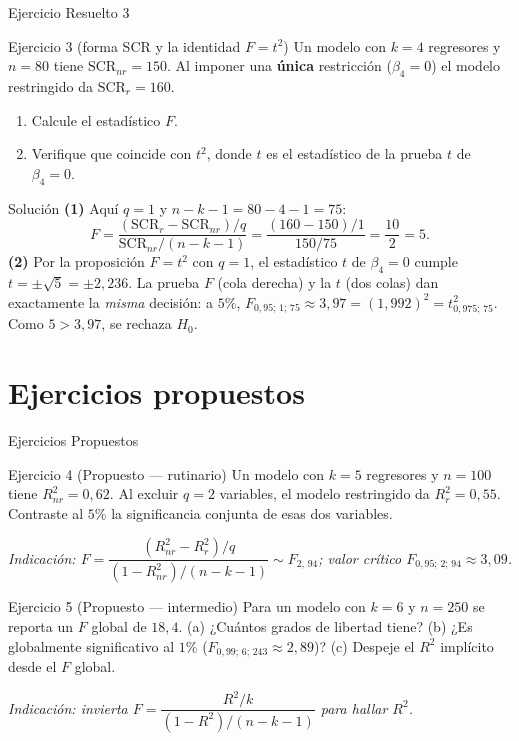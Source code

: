 \documentclass{beamer}
\begin{document}
\begin{frame}{Ejercicio Resuelto 3}
\begin{block}{Ejercicio 3 (forma SCR y la identidad $F=t^2$)}
Un modelo con $k=4$ regresores y $n=80$ tiene $\text{SCR}_{nr}=150$. Al imponer una \textbf{única} restricción ($\beta_4=0$) el modelo restringido da $\text{SCR}_r=160$.
\begin{enumerate}
    \item Calcule el estadístico $F$.
    \item Verifique que coincide con $t^2$, donde $t$ es el estadístico de la prueba $t$ de $\beta_4=0$.
\end{enumerate}
\end{block}

\pause

\begin{exampleblock}{Solución}
\textbf{(1)} Aquí $q=1$ y $n-k-1 = 80-4-1 = 75$:
\[
   F = \frac{(\text{SCR}_r-\text{SCR}_{nr})/q}{\text{SCR}_{nr}/(n-k-1)} = \frac{(160-150)/1}{150/75} = \frac{10}{2} = 5.
\]
\textbf{(2)} Por la proposición $F=t^2$ con $q=1$, el estadístico $t$ de $\beta_4=0$ cumple $t=\pm\sqrt{5}=\pm 2{,}236$. La prueba $F$ (cola derecha) y la $t$ (dos colas) dan exactamente la \emph{misma} decisión: a $5\%$, $F_{0{,}95;\,1;\,75}\approx 3{,}97 = (1{,}992)^2 = t^2_{0{,}975;\,75}$. Como $5>3{,}97$, se rechaza $H_0$.
\end{exampleblock}
\end{frame}

\section{Ejercicios propuestos}

\begin{frame}{Ejercicios Propuestos}

\begin{block}{Ejercicio 4 (Propuesto — rutinario)}
Un modelo con $k=5$ regresores y $n=100$ tiene $R^2_{nr}=0{,}62$. Al excluir $q=2$ variables, el modelo restringido da $R^2_r=0{,}55$. Contraste al $5\%$ la significancia conjunta de esas dos variables.
\end{block}
{\small \textit{Indicación: $F=\dfrac{(R^2_{nr}-R^2_r)/q}{(1-R^2_{nr})/(n-k-1)}\sim F_{2,\,94}$; valor crítico $F_{0{,}95;\,2;\,94}\approx 3{,}09$.}}

\pause

\begin{block}{Ejercicio 5 (Propuesto — intermedio)}
Para un modelo con $k=6$ y $n=250$ se reporta un $F$ global de $18{,}4$. (a) ¿Cuántos grados de libertad tiene? (b) ¿Es globalmente significativo al $1\%$ ($F_{0{,}99;\,6;\,243}\approx 2{,}89$)? (c) Despeje el $R^2$ implícito desde el $F$ global.
\end{block}
{\small \textit{Indicación: invierta $F=\dfrac{R^2/k}{(1-R^2)/(n-k-1)}$ para hallar $R^2$.}}

\end{frame}
\end{document}
